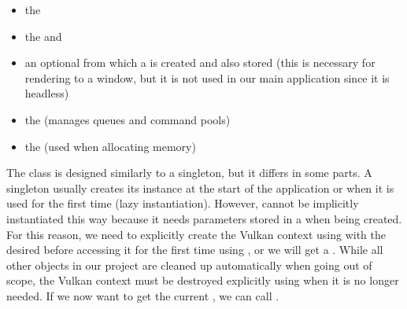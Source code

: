 \begin{itemize}
    \item the 
    \item the  and 
    \item an optional  from which a  is created and also stored (this is necessary for rendering to a window, but it is not used in our main application since it is headless)
    \item the  (manages queues and command pools)
    \item the  (used when allocating memory)
\end{itemize}

The class is designed similarly to a singleton, but it differs in some parts. A singleton usually creates its instance at the start of the application or when it is used for the first time (lazy instantiation). However,  cannot be implicitly instantiated this way because it needs parameters stored in a  when being created. For this reason, we need to explicitly create the Vulkan context using  with the desired  before accessing it for the first time using , or we will get a . While all other objects in our project are cleaned up automatically when going out of scope, the Vulkan context must be destroyed explicitly using  when it is no longer needed. If we now want to get the current , we can call .

\pagebreak